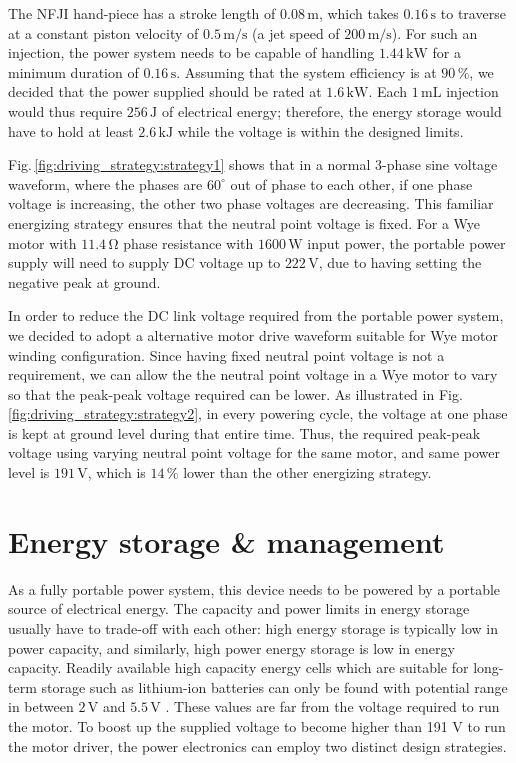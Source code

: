     
    The NFJI hand-piece has a stroke length of $0.08\,\mathrm{m}$, which takes $0.16\,\mathrm{s}$ to traverse at a constant piston velocity of $0.5\,\mathrm{m/s}$ (a jet speed of $200\,\mathrm{m/s}$). For such an injection, the power system needs to be capable of handling $1.44\,\mathrm{kW}$ for a minimum duration of $0.16\,\mathrm{s}$.  Assuming that the system efficiency is at $90\,\%$, we decided that the power supplied should be rated at $1.6\,\mathrm{kW}$. Each $1\,\mathrm{mL}$ injection would thus require $256\,\mathrm{J}$ of electrical energy; therefore, the energy storage would have to hold at least $2.6\,\mathrm{kJ}$ while the voltage is within the designed limits. 


    Fig.\,\ref{fig:driving_strategy:strategy1} shows that in a normal 3-phase sine voltage waveform, where the phases are $60^{\circ}$ out of phase to each other, if one phase voltage is increasing, the other two phase voltages are decreasing. This familiar energizing strategy ensures that the neutral point voltage is fixed. For a Wye motor with $11.4\,\mathrm{\Omega}$ phase resistance with $1600\,\mathrm{W}$ input power, the portable power supply will need to supply DC voltage up to $222\,\mathrm{V}$, due to having setting the negative peak at ground.
    
    In order to reduce the DC link voltage required from the portable power system, we decided to adopt a alternative motor drive waveform suitable for Wye motor winding configuration. Since having fixed neutral point voltage is not a requirement, we can allow the the neutral point voltage in a Wye motor to vary so that the peak-peak voltage required can be lower. As illustrated in Fig.\,\ref{fig:driving_strategy:strategy2}, in every powering cycle, the voltage at one phase is kept at ground level during that entire time. Thus, the required peak-peak voltage using varying neutral point voltage for the same motor, and same power level is $191\,\mathrm{V}$, which is $14\,\%$ lower than the other energizing strategy. 
    
\section{Energy storage \& management}

    As a fully portable power system, this device needs to be powered by a portable source of electrical energy. The capacity and power limits in energy storage usually have to trade-off with each other: high energy storage is typically low in power capacity, and similarly, high power energy storage is low in energy capacity. Readily available high capacity energy cells which are suitable for long-term storage such as lithium-ion batteries can only be found with potential range in between $2\,\mathrm{V}$ and $5.5\,\mathrm{V}$ \cite{Hu2013}. These values are far from the voltage required to run the motor. To boost up the supplied voltage to become higher than 191 V to run the motor driver, the power electronics can employ two distinct design strategies. 
    
